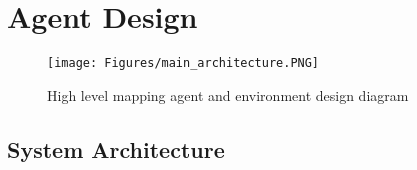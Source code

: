 






\chapter{Agent Design} 
\label{chapter:Agent_Design}

\begin{figure}[H]
    \centering
    \texttt{[image: Figures/main\_architecture.PNG]}
    \caption{High level mapping agent and environment design diagram} 
    \label{fig:agent_and_environment_design}
\end{figure}



\section{System Architecture}

